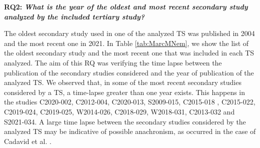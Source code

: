 \documentclass[sigconf]{acmart}
\begin{document}

\textbf{RQ2:} \textbf{\textit{What is the year of the oldest and most recent secondary study analyzed by the included tertiary study?}}

The oldest secondary study used in one of the analyzed TS was published in 2004 and the most recent one in 2021. In Table \ref{tab:MarcMNem}, we show the list of the oldest secondary study and the most recent one that was included in each TS analyzed. The aim of this RQ was verifying the time lapse between the publication of the secondary studies considered and the year of publication of the analyzed TS. We observed that, in some of the most recent secondary studies considered by a TS, a time-lapse greater than one year exists. This happens in the studies C2020-002, C2012-004, C2020-013, S2009-015, C2015-018 , C2015-022, C2019-024, C2019-025, W2014-026, C2018-029, W2018-031, C2013-032 and S2021-034. %
A large time lapse between the secondary studies considered by the analyzed TS may be indicative of possible anachronism, as occurred in the case of Cadavid et al. \cite{Cadavid2020}.\\
\vspace{-0.4cm}
\end{document}
